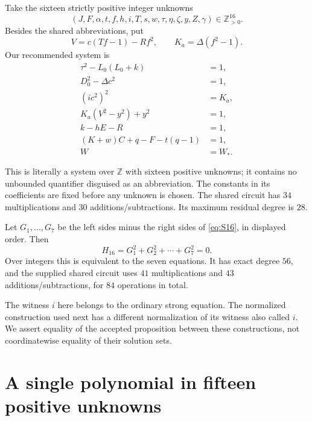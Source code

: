 \documentclass[11pt,a4paper]{article}
\theoremstyle{remark}
\newcommand{\Z}{\mathbb Z}
\newcommand{\Zp}{\mathbb Z_{>0}}
\begin{document}
Take the sixteen strictly positive integer unknowns
\begin{equation}
 (J,F,\alpha,t,f,h,i,T,s,w,\tau,\eta,\zeta,y,Z,\gamma)\in\Zp^{16}.
\label{eq:16vars}
\end{equation}
Besides the shared abbreviations, put
\begin{equation}
 V=c(Tf-1)-Rf^2,\qquad K_a=\Delta(f^2-1).
\label{eq:ordinaryaux}
\end{equation}
Our recommended system is
\begin{equation}
\boxed{\quad
\begin{aligned}
 \tau^2-L_0(L_0+k)&=1,\\
 D_0^2-\Delta c^2&=1,\\
 (ic^2)^2&=K_a,\\
 K_a(V^2-y^2)+y^2&=1,\\
 k-hE-R&=1,\\
 (K+w)C+q-F-t(q-1)&=1,\\
 W&=W_*.
\end{aligned}\quad}
\label{eq:S16}
\end{equation}

This is literally a system over $\Z$ with sixteen positive unknowns; it
contains no unbounded quantifier disguised as an abbreviation. The
constants in its coefficients are fixed before any unknown is chosen.
The shared circuit has $34$ multiplications and $30$
additions/subtractions. Its maximum residual degree is $28$.

Let $G_1,\ldots,G_7$ be the left sides minus the right sides of
\eqref{eq:S16}, in displayed order. Then
\begin{equation}
 \boxed{\quad H_{16}=G_1^2+G_2^2+\cdots+G_7^2=0.\quad}
\label{eq:sos}
\end{equation}
Over integers this is equivalent to the seven equations. It has exact
degree $56$, and the supplied shared circuit uses $41$ multiplications
and $43$ additions/subtractions, for $84$ operations in total.

The witness $i$ here belongs to the ordinary strong equation. The
normalized construction used next has a different normalization of its
witness also called $i$. We assert equality of the accepted proposition
between these constructions, not coordinatewise equality of their
solution sets.

\section{A single polynomial in fifteen positive unknowns}
\label{sec:p15}
\end{document}
